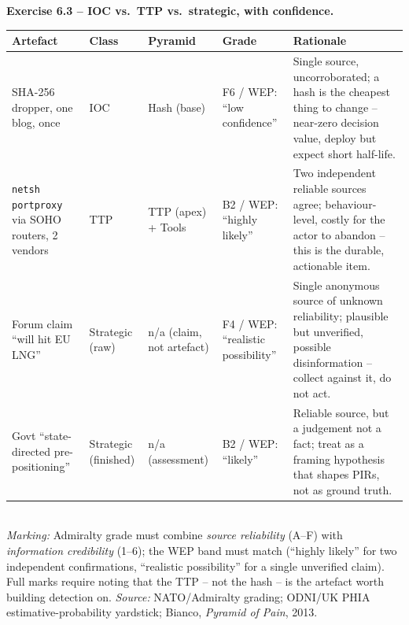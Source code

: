 \documentclass[11pt,a4paper]{article}
\begin{document}
\begin{solutionbox}
\textbf{Exercise 6.3 -- IOC vs.\ TTP vs.\ strategic, with confidence.}\\[2pt]
\par\begin{tabular}{p{2.4cm} p{1.7cm} p{2.6cm} p{2.2cm} p{4.0cm}}
\toprule
\textbf{Artefact} & \textbf{Class} & \textbf{Pyramid} & \textbf{Grade} & \textbf{Rationale} \\
\midrule
SHA-256 dropper, one blog, once & IOC & Hash (base) & F6 / WEP: ``low confidence'' &
  Single source, uncorroborated; a hash is the cheapest thing to change -- near-zero decision
  value, deploy but expect short half-life. \\
\texttt{netsh portproxy} via SOHO routers, 2 vendors & TTP & TTP (apex) + Tools &
  B2 / WEP: ``highly likely'' & Two independent reliable sources agree; behaviour-level, costly
  for the actor to abandon -- this is the durable, actionable item. \\
Forum claim ``will hit EU LNG'' & Strategic (raw) & n/a (claim, not artefact) &
  F4 / WEP: ``realistic possibility'' & Single anonymous source of unknown reliability;
  plausible but unverified, possible disinformation -- collect against it, do not act. \\
Govt ``state-directed pre-positioning'' & Strategic (finished) & n/a (assessment) &
  B2 / WEP: ``likely'' & Reliable source, but a judgement not a fact; treat as a framing
  hypothesis that shapes PIRs, not as ground truth. \\
\bottomrule
\end{tabular}\\[3pt]
\emph{Marking:} Admiralty grade must combine \emph{source reliability} (A--F) with
\emph{information credibility} (1--6); the WEP band must match (``highly likely'' for two
independent confirmations, ``realistic possibility'' for a single unverified claim). Full marks
require noting that the TTP -- not the hash -- is the artefact worth building detection on.
\emph{Source:} NATO/Admiralty grading; ODNI/UK PHIA estimative-probability yardstick;
Bianco, \emph{Pyramid of Pain}, 2013.
\end{solutionbox}
\end{document}
